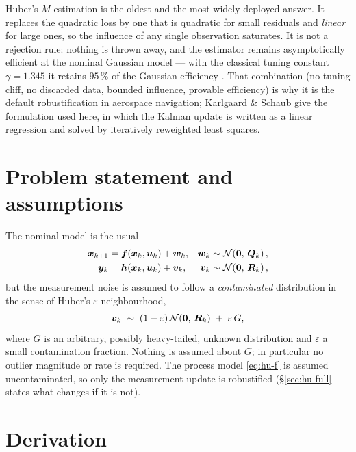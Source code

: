 Huber's $M$-estimation \cite{huber1964} is the oldest and the most widely deployed answer.  It
replaces the quadratic loss by one that is quadratic for small residuals and \emph{linear} for
large ones, so the influence of any single observation saturates.  It is not a rejection rule:
nothing is thrown away, and the estimator remains asymptotically efficient at the nominal Gaussian
model --- with the classical tuning constant $\gamma=1.345$ it retains $95\,\%$ of the Gaussian
efficiency \cite{huber2009robust}.  That combination (no tuning cliff, no discarded data, bounded
influence, provable efficiency) is why it is the default robustification in aerospace navigation;
Karlgaard \& Schaub \cite{karlgaard2007huber} give the formulation used here, in which the Kalman
update is written as a linear regression and solved by iteratively reweighted least squares.

\section{Problem statement and assumptions}
The nominal model is the usual
\begin{align}
\bm{x}_{k+1} &= \bm{f}(\bm{x}_k,\bm{u}_k)+\bm{w}_k, & \bm{w}_k&\sim\mathcal{N}\!\left(\bm 0,\,\bm{Q}_k\right), \label{eq:hu-f}\\
\bm{y}_k &= \bm{h}(\bm{x}_k,\bm{u}_k)+\bm{v}_k, & \bm{v}_k&\sim\mathcal{N}\!\left(\bm 0,\,\bm{R}_k\right), \label{eq:hu-h}
\end{align}
but the measurement noise is assumed to follow a \emph{contaminated} distribution in the sense of
Huber's $\varepsilon$-neighbourhood,
\begin{equation}
\bm{v}_k \;\sim\; (1-\varepsilon)\,\mathcal{N}\!\left(\bm 0,\,\bm{R}_k\right) \;+\; \varepsilon\,G,
\label{eq:hu-contam}
\end{equation}
where $G$ is an arbitrary, possibly heavy-tailed, unknown distribution and $\varepsilon$ a small
contamination fraction.  Nothing is assumed about $G$; in particular no outlier magnitude or rate
is required.  The process model \eqref{eq:hu-f} is assumed uncontaminated, so only the measurement
update is robustified (\S\ref{sec:hu-full} states what changes if it is not).

\section{Derivation}

